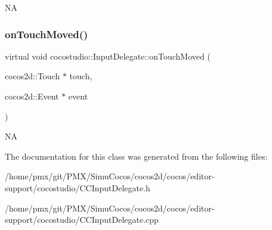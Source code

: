 NA \mbox{\label{classcocostudio_1_1InputDelegate_adc37729914cd05f43538d18ee14abfce}} 
\subsubsection{\texorpdfstring{on\+Touch\+Moved()}{onTouchMoved()}\hspace{0.1cm}{\footnotesize\ttfamily [2/2]}}
{\footnotesize\ttfamily virtual void cocostudio\+::\+Input\+Delegate\+::on\+Touch\+Moved (\begin{DoxyParamCaption}\item[{cocos2d\+::\+Touch $\ast$}]{touch,  }\item[{cocos2d\+::\+Event $\ast$}]{event }\end{DoxyParamCaption})\hspace{0.3cm}{\ttfamily [virtual]}}

NA 

The documentation for this class was generated from the following files\+:\begin{DoxyCompactItemize}
\item 
/home/pmx/git/\+P\+M\+X/\+Simu\+Cocos/cocos2d/cocos/editor-\/support/cocostudio/C\+C\+Input\+Delegate.\+h\item 
/home/pmx/git/\+P\+M\+X/\+Simu\+Cocos/cocos2d/cocos/editor-\/support/cocostudio/C\+C\+Input\+Delegate.\+cpp\end{DoxyCompactItemize}
